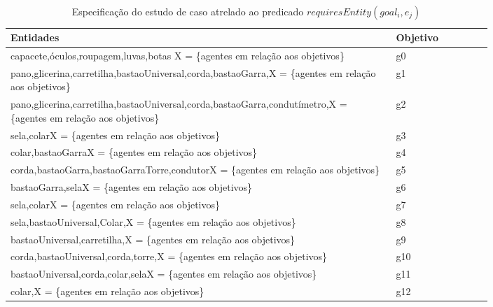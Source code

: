 \begin{center}
\begin{longtable}[H]{|p{0.8\linewidth}|l|}
\caption{Especificação do estudo de caso atrelado ao predicado $requiresEntity(goal_i, e_j)$} \label{entitygoals}
\hline
\textbf{Entidades}                                                                                                 & \textbf{Objetivo} \\ \hline
capacete,óculos,roupagem,luvas,botas X = \{agentes em relação aos objetivos\}                                      & g0         \\ \hline
pano,glicerina,carretilha,bastaoUniversal,corda,bastaoGarra,X = \{agentes em relação aos objetivos\}               & g1         \\ \hline
pano,glicerina,carretilha,bastaoUniversal,corda,bastaoGarra,condutímetro,X = \{agentes em relação aos objetivos\}  & g2         \\ \hline
sela,colarX = \{agentes em relação aos objetivos\}                                                                 & g3         \\ \hline
colar,bastaoGarraX = \{agentes em relação aos objetivos\}                                                          & g4         \\ \hline
corda,bastaoGarra,bastaoGarraTorre,condutorX = \{agentes em relação aos objetivos\}                                & g5         \\ \hline
bastaoGarra,selaX = \{agentes em relação aos objetivos\}                                                           & g6         \\ \hline
sela,colarX = \{agentes em relação aos objetivos\}                                                                 & g7         \\ \hline
sela,bastaoUniversal,Colar,X = \{agentes em relação aos objetivos\}                                                & g8         \\ \hline
bastaoUniversal,carretilha,X = \{agentes em relação aos objetivos\}                                                & g9         \\ \hline
corda,bastaoUniversal,corda,torre,X = \{agentes em relação aos objetivos\}                                         & g10        \\ \hline
bastaoUniversal,corda,colar,selaX = \{agentes em relação aos objetivos\}                                       	   & g11        \\ \hline
colar,X = \{agentes em relação aos objetivos\}                                                                     & g12        \\ \hline

\end{longtable}
\end{center}
